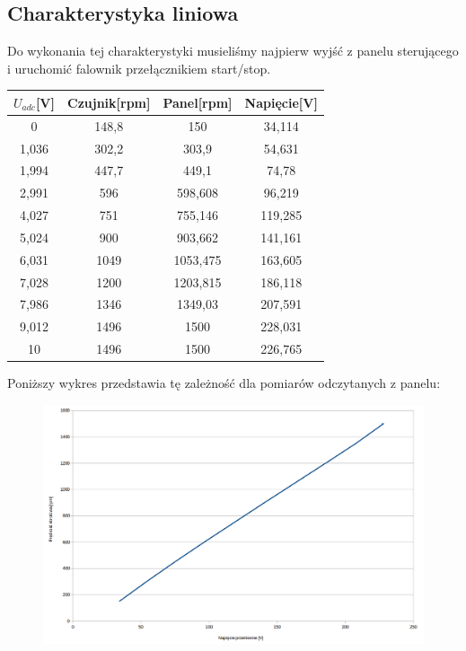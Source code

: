 \documentclass[a4paper, 12pt]{article}
\begin{document}
		\subsection{Charakterystyka liniowa}
			Do wykonania tej charakterystyki musieliśmy najpierw wyjść z panelu sterującego i uruchomić falownik przełącznikiem start/stop.
			\begin{center}
				\begin{tabular}{|c|c|c|c|}
					\hline $U_{adc}$[V] & Czujnik[rpm] & Panel[rpm] & Napięcie[V] \\ 
					\hline 0 & 148,8 & 150 & 34,114\\ 
					\hline 1,036 & 302,2 & 303,9 & 54,631\\ 
					\hline 1,994 & 447,7 & 449,1 & 74,78\\ 
					\hline 2,991 & 596 & 598,608 & 96,219\\ 
					\hline 4,027 & 751 & 755,146 & 119,285\\ 
					\hline 5,024 & 900 & 903,662 & 141,161 \\ 
					\hline 6,031 & 1049 & 1053,475 & 163,605 \\ 
					\hline 7,028 & 1200 & 1203,815 & 186,118\\ 
					\hline 7,986 & 1346 & 1349,03  & 207,591\\ 
					\hline 9,012 & 1496 & 1500 & 228,031\\ 
					\hline 10 & 1496 & 1500 & 226,765\\ 
					\hline 
				\end{tabular} 
			\end{center}
			Poniższy wykres przedstawia tę zależność dla pomiarów odczytanych z panelu:
			\begin{figure}[H]
				\centering
				\includegraphics[width=\textwidth]{./img/drugie.png}
			\end{figure}
\end{document}
